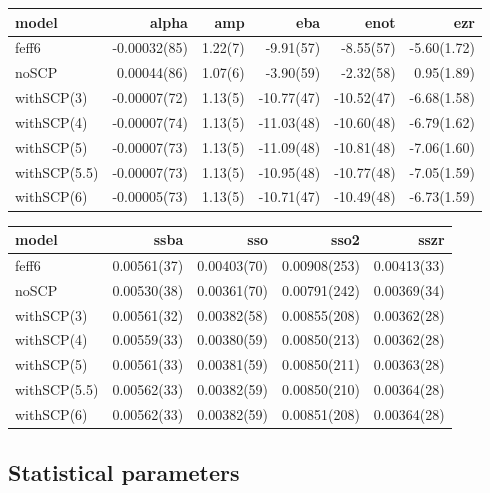 \documentclass[11pt]{article}
\begin{document}
\begin{center}
  \footnotesize
  \begin{tabular}{lrrrrr}
    model & alpha & amp & eba & enot & ezr \\
    \hline
    feff6        & -0.00032(85) & 1.22(7) &  -9.91(57) &  -8.55(57) & -5.60(1.72) \\
    noSCP        &  0.00044(86) & 1.07(6) &  -3.90(59) &  -2.32(58) &  0.95(1.89) \\
    withSCP(3)   & -0.00007(72) & 1.13(5) & -10.77(47) & -10.52(47) & -6.68(1.58) \\
    withSCP(4)   & -0.00007(74) & 1.13(5) & -11.03(48) & -10.60(48) & -6.79(1.62) \\
    withSCP(5)   & -0.00007(73) & 1.13(5) & -11.09(48) & -10.81(48) & -7.06(1.60) \\
    withSCP(5.5) & -0.00007(73) & 1.13(5) & -10.95(48) & -10.77(48) & -7.05(1.59) \\
    withSCP(6)   & -0.00005(73) & 1.13(5) & -10.71(47) & -10.49(48) & -6.73(1.59) \\
  \end{tabular}

  \begin{tabular}{lrrrr}
    model  & ssba & sso & sso2 & sszr\\
    \hline
    feff6        & 0.00561(37) & 0.00403(70) & 0.00908(253) & 0.00413(33)\\
    noSCP        & 0.00530(38) & 0.00361(70) & 0.00791(242) & 0.00369(34)\\
    withSCP(3)   & 0.00561(32) & 0.00382(58) & 0.00855(208) & 0.00362(28)\\
    withSCP(4)   & 0.00559(33) & 0.00380(59) & 0.00850(213) & 0.00362(28)\\
    withSCP(5)   & 0.00561(33) & 0.00381(59) & 0.00850(211) & 0.00363(28)\\
    withSCP(5.5) & 0.00562(33) & 0.00382(59) & 0.00850(210) & 0.00364(28)\\
    withSCP(6)   & 0.00562(33) & 0.00382(59) & 0.00851(208) & 0.00364(28)\\
  \end{tabular}
\end{center}

\subsection{Statistical parameters}
\label{sec:orgheadline27}
\end{document}
